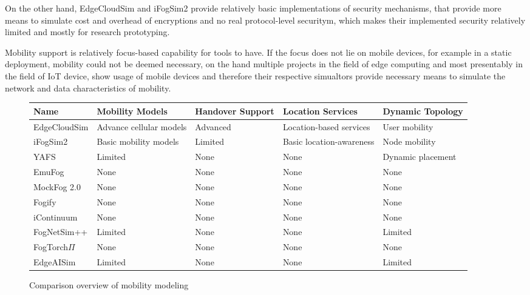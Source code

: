 On the other hand, EdgeCloudSim and iFogSim2 provide relatively basic implementations of security mechanisms, that provide more means to simulate cost and overhead of encryptions and no real protocol-level securitym, which makes their implemented security relatively limited and mostly for research prototyping.
 
Mobility support is relatively focus-based capability for tools to have. 
If the focus does not lie on mobile devices, for example in a static deployment, mobility could not be deemed necessary, on the hand multiple projects in the field of edge computing and most presentably in the field of IoT device, show usage of mobile devices and therefore their respective simualtors provide necessary means to simulate the network and data characteristics of mobility.
\begin{figure}[H]
  \centering
  \begin{tabularx}{\textwidth}{ l | X | X | X | X }
    \hline
    \textbf{Name} & \textbf{Mobility Models} & \textbf{Handover Support} & \textbf{Location Services} & \textbf{Dynamic Topology}\\
    \hline\hline
    EdgeCloudSim  & Advance cellular models & Advanced  & Location-based services   & User mobility \\\hline
    iFogSim2      & Basic mobility models   & Limited   & Basic location-awareness  & Node mobility \\\hline
    YAFS          & Limited                 & None      & None                      & Dynamic placement \\\hline
    EmuFog        & None                    & None      & None                      & None \\\hline
    MockFog 2.0   & None                    & None      & None                      & None \\\hline
    Fogify        & None                    & None      & None                      & None \\\hline
    iContinuum    & None                    & None      & None                      & None \\\hline
    FogNetSim++   & Limited                 & None      & None                      & Limited  \\\hline
    FogTorch$\Pi$ & None                    & None      & None                      & None \\\hline
    EdgeAISim     & Limited                 & None      & None                      & Limited \\\hline
  \end{tabularx}
  \caption{Comparison overview of mobility modeling}
  \label{tab:analysis-mobility}
\end{figure}

